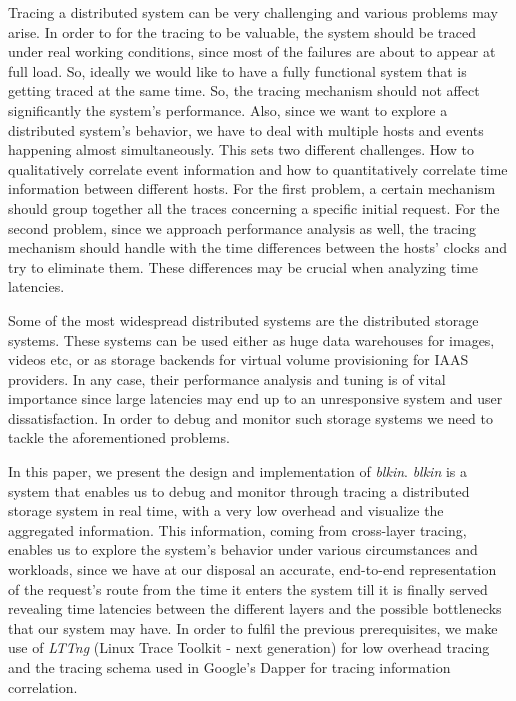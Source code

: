 \documentclass[a4paper,10pt,twocolumn]{article}
\begin{document}
Tracing a distributed system can be very challenging and various problems may
arise. In order to for the tracing to be valuable, the system should be traced
under real working conditions, since most of the failures are about to appear at
full load. So, ideally we would like to have a fully functional system that is
getting traced at the same time. So, the tracing mechanism should not affect
significantly the system's performance. Also, since we want to explore a
distributed system's behavior, we have to deal with multiple hosts and events
happening almost simultaneously. This sets two different challenges.  How to
qualitatively correlate event information and how to quantitatively correlate
time information between different hosts. For the first problem, a certain
mechanism should group together all the traces concerning a specific initial
request. For the second problem, since we approach performance analysis as well,
the tracing mechanism should handle with the time differences between the hosts'
clocks and try to eliminate them. These differences may be crucial when
analyzing time latencies.

Some of the most widespread distributed systems are the distributed storage
systems. These systems can be used either as huge data warehouses for images,
videos etc, or as storage backends for virtual volume provisioning for IAAS
providers. In any case, their performance analysis and tuning is of vital
importance since large latencies may end up to an unresponsive system and user
dissatisfaction. In order to debug and monitor such storage systems we need to
tackle the aforementioned problems.

In this paper, we present the design and implementation of \emph{blkin}.
\emph{blkin} is a system that enables us to debug and monitor through tracing a
distributed storage system in real time, with a very low overhead and visualize
the aggregated information. This information, coming from cross-layer tracing,
enables us to explore the system's behavior under various circumstances and
workloads, since we have at our disposal an accurate, end-to-end representation
of the request's route from the time it enters the system till it is finally
served revealing time latencies between the different layers and the possible
bottlenecks that our system may have. In order to fulfil the previous
prerequisites, we make use of \emph{LTTng} (Linux Trace Toolkit - next
generation)\cite{lttng} for low overhead tracing and the tracing schema used in
Google's Dapper for tracing information correlation.
\end{document}
